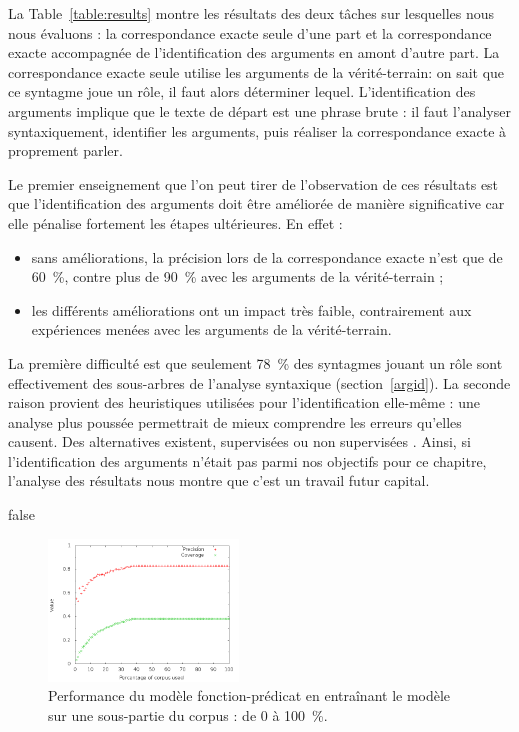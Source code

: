 La Table~\ref{table:results} montre les résultats des deux tâches sur
lesquelles nous nous évaluons : la correspondance exacte seule d'une part et la
correspondance exacte accompagnée de l'identification des arguments en amont
d'autre part. La correspondance exacte seule utilise les arguments de la
vérité-terrain: on sait que ce syntagme joue un rôle, il faut alors déterminer
lequel.  L'identification des arguments implique que le texte de départ est une
phrase brute : il faut l'analyser syntaxiquement, identifier les arguments,
puis réaliser la correspondance exacte à proprement parler.

Le premier enseignement que l'on peut tirer de l'observation de ces résultats
est que l'identification des arguments doit être améliorée de manière
significative car elle pénalise fortement les étapes ultérieures. En effet :

\begin{itemize}
    \item sans améliorations, la précision lors de la correspondance exacte
        n'est que de 60~\%, contre plus de 90~\% avec les arguments de la
        vérité-terrain ;
    \item les différents améliorations ont un impact très faible, contrairement
        aux expériences menées avec les arguments de la vérité-terrain.
\end{itemize}

La première difficulté est que seulement 78~\% des syntagmes jouant un rôle
sont effectivement des sous-arbres de l'analyse syntaxique
(section~\ref{argid}). La seconde raison provient des heuristiques utilisées
pour l'identification elle-même : une analyse plus poussée permettrait de mieux
comprendre les erreurs qu'elles causent. Des alternatives existent, supervisées
ou non supervisées \citep{abend2009unsupervised}. Ainsi, si l'identification
des arguments n'était pas parmi nos objectifs pour ce chapitre, l'analyse des
résultats nous montre que c'est un travail futur capital.

\if false


\begin{figure}
    \centering
    \includegraphics[width=0.45\textwidth]{fig/slot-predicate-percents.png}
    \caption{\label{fig:fonction_predicate}Performance du modèle
        fonction-prédicat en entraînant le modèle sur une sous-partie du corpus
        : de 0 à 100~\%.}
\end{figure}

